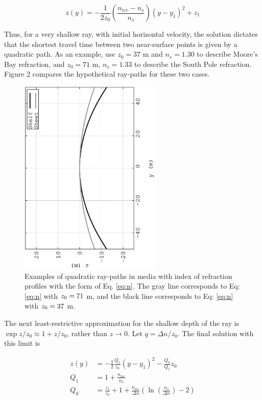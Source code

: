 \documentclass[12pt]{article}
\begin{document}
\begin{equation}
z(y) = -\frac{1}{2z_0} \left( \frac{n_{ice} - n_s}{n_s}\right) (y-y_1)^2 + z_1
\end{equation}

Thus, for a very shallow ray, with initial horizontal velocity, the solution dictates that the shortest travel time between two near-surface points is given by a quadratic path.  As an example, use $z_0 = 37$ m and $n_s = 1.30$ to describe Moore's Bay refraction, and $z_0 = 71$ m, $n_s = 1.33$ to describe the South Pole refraction.  Figure 2 compares the hypothetical ray-paths for these two cases.

\begin{figure}
\centering
\includegraphics[width=0.6\textwidth,angle=270]{figures/Jan24_plot1.eps}
\caption{\label{fig:quad} Examples of quadratic ray-paths in media with index of refraction profiles with the form of Eq. \ref{eq:n}.  The gray line corresponds to Eq: \ref{eq:n} with $z_{\rm 0} = 71$ m, and the black line corresponds to Eq: \ref{eq:n} with $z_{\rm 0} = 37$ m.}
\end{figure}

The next least-restrictive approximation for the shallow depth of the ray is $\exp{z/z_0} \approx 1+z/z_0$, rather than $z \rightarrow 0$.  Let $q = \Delta n/z_0$.  The final solution with this limit is

\begin{align}
z(y) &= -\frac{1}{2}\frac{Q_1}{z_0}(y-y_1)^2 - \frac{Q_0}{Q_1}z_0 \\
Q_1 &= 1+\frac{n_{ice}}{n_s} \\
Q_0 &= \frac{z_1}{z_0} + 1 + \frac{n_{ice}}{\Delta n}\left(\ln\left(\frac{n_s}{\Delta n}\right)-2\right)
\end{align}
\end{document}
